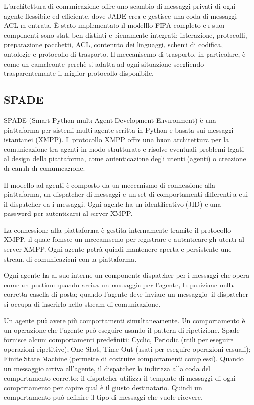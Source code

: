 
L'architettura di comunicazione offre uno scambio di messaggi privati di ogni agente  flessibile ed efficiente, dove JADE crea e gestisce una coda di messaggi ACL in entrata.
\`E stato implementato il modelllo FIPA completo e i suoi componenti sono stati ben distinti e pienamente integrati: interazione, protocolli, preparazione pacchetti, ACL, contenuto dei linguaggi, schemi di codifica, ontologie e protocollo di trasporto.
Il meccaniscmo di trasporto, in particolare, \`e come un camaleonte perch\`e si adatta ad ogni situazione scegliendo trasparentemente il miglior protocollo disponibile.

\subsection{SPADE}
SPADE (Smart Python multi-Agent Development Environment) \`e una piattaforma per sistemi multi-agente scritta in Python e basata sui messaggi istantanei (XMPP).
Il protocollo XMPP offre una buon architettura per la comunicazione tra agenti in modo strutturato e risolve eventuali problemi legati al design della piattaforma, come autenticazione degli utenti (agenti) o creazione di canali di comunicazione.

Il modello ad agenti \`e composto da un meccanismo di connessione alla piattaforma, un dispatcher di messaggi e un set di comportamenti differenti a cui il dispatcher da i messaggi. Ogni agente ha un identificativo (JID) e una password per autenticarsi al server XMPP.

La connessione alla piattaforma \`e gestita internamente tramite il protocollo XMPP, il quale fonisce un meccaniscmo per registrare e autenticare gli utenti al server XMPP. Ogni agente potr\`a quindi mantenere aperta e persistente uno stream di comunicazioni con la piattaforma.

Ogni agente ha al suo interno un componente dispatcher per i messaggi che opera come un postino: quando arriva un messaggio per l'agente, lo posizione nella corretta casella di posta; quando l'agente deve inviare un messaggio, il dispatcher si occupa di inserirlo nello stream di comunicazione.

Un agente pu\`o avere pi\`u comportamenti simultaneamente. Un comportamento \`e un operazione che l'agente pu\`o eseguire usando il pattern di ripetizione. Spade fornisce alcuni comportamenti predefiniti: Cyclic, Periodic (utili per eseguire operazioni ripetitive); One-Shot, Time-Out (usati per eseguire operazioni casuali); Finite State Machine (permette di costruire comportamenti complessi).
Quando un messaggio arriva all'agente, il dispatcher lo indirizza alla coda del comportamento corretto: il dispatcher utilizza il template di messaggi di ogni comportamento per capire qual \`e il giusto destinatario. Quindi un comportamento pu\`o definire il tipo di messaggi che vuole ricevere.


